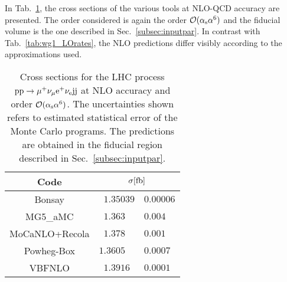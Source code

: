 In Tab.~\ref{tab:wg1_NLOrates}, the cross sections of the various tools at NLO-QCD accuracy are presented.
The order considered is again the order $\mathcal{O}(\alpha_{\rm s}\alpha^6)$ and the fiducial volume is the one described in Sec.~\ref{subsec:inputpar}.
In contrast with Tab.~\ref{tab:wg1_LOrates}, the NLO predictions differ visibly according to the approximations used.

\begin{table}[h!]
    \centering
    \begin{tabular}{c|r@{ $\pm$ }l}
      Code  &  \multicolumn{2}{c}{$\sigma[\rm{fb}]$}  \\
        \hline
        \hline
        {\sc Bonsay}  &  $1.35039$ & $0.00006$  \\
        {\sc MG5\_aMC}&  $1.363\phantom{0}\phantom{0}$ & $0.004$  \\
        {\sc MoCaNLO+Recola}  &  $ 1.378\phantom{0}\phantom{0}$ & $0.001$ \\
        {\sc Powheg-Box}  &  $1.3605\phantom{0}\phantom{0}$  & $0.0007$   \\
        {\sc VBFNLO}  &  $1.3916\phantom{0}$ & $0.0001$  \\
    \end{tabular}
    \caption{\label{tab:wg1_NLOrates} Cross sections for the LHC process ${\rm p}{\rm p}\to\mu^+\nu_\mu{\rm e}^+\nu_{\rm e}{\rm j}{\rm j}$ at NLO accuracy and order $\mathcal{O}(\alpha_\text{s}\alpha^6)$.
    The uncertainties shown refers to estimated statistical error of the Monte Carlo programs.
    The predictions are obtained in the fiducial region described in Sec.~\ref{subsec:inputpar}.
    }
\end{table}

